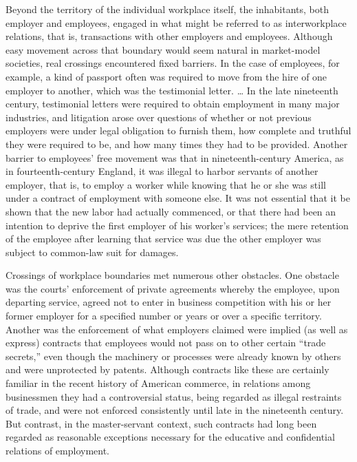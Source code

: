 \documentclass[
  letterpaper,
  11pt,
  DIV=9,
  openright]{scrbook}
\begin{document}
Beyond the territory of the individual workplace itself, the
inhabitants, both employer and employees, engaged in what might be
referred to as interworkplace relations, that is, transactions with
other employers and employees. Although easy movement across that
boundary would seem natural in market-model societies, real crossings
encountered fixed barriers. In the case of employees, for example, a
kind of passport often was required to move from the hire of one
employer to another, which was the testimonial letter. \ldots{} In the
late nineteenth century, testimonial letters were required to obtain
employment in many major industries, and litigation arose over questions
of whether or not previous employers were under legal obligation to
furnish them, how complete and truthful they were required to be, and
how many times they had to be provided. Another barrier to employees'
free movement was that in nineteenth-century America, as in
fourteenth-century England, it was illegal to harbor servants of another
employer, that is, to employ a worker while knowing that he or she was
still under a contract of employment with someone else. It was not
essential that it be shown that the new labor had actually commenced, or
that there had been an intention to deprive the first employer of his
worker's services; the mere retention of the employee after learning
that service was due the other employer was subject to common-law suit
for damages.

Crossings of workplace boundaries met numerous other obstacles. One
obstacle was the courts' enforcement of private agreements whereby the
employee, upon departing service, agreed not to enter in business
competition with his or her former employer for a specified number or
years or over a specific territory. Another was the enforcement of what
employers claimed were implied (as well as express) contracts that
employees would not pass on to other certain ``trade secrets,'' even
though the machinery or processes were already known by others and were
unprotected by patents. Although contracts like these are certainly
familiar in the recent history of American commerce, in relations among
businessmen they had a controversial status, being regarded as illegal
restraints of trade, and were not enforced consistently until late in
the nineteenth century. But contrast, in the master-servant context,
such contracts had long been regarded as reasonable exceptions necessary
for the educative and confidential relations of employment.
\end{document}
